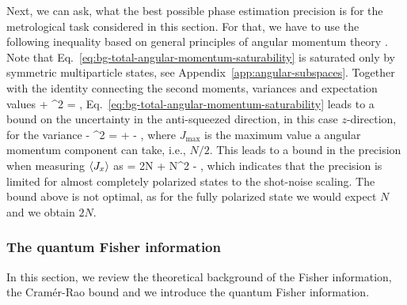 Next, we can ask, what the best possible phase estimation precision is for the metrological task considered in this section.
For that, we have to use the following inequality based on general principles of angular momentum theory
\be
  \label{eq:bg-total-angular-momentum-saturability}
   \leqslant {}.
\ee
Note that Eq.~\eqref{eq:bg-total-angular-momentum-saturability} is saturated only by symmetric multiparticle states, see Appendix~\ref{app:angular-subspaces}.
Together with the identity connecting the second moments, variances and expectation values
\be
   + ^2 = ,
\ee
Eq.~\eqref{eq:bg-total-angular-momentum-saturability} leads to a bound on the uncertainty in the anti-squeezed direction, in this case $z$-direction, for the variance
\be
   \leqslant {} - ^2 =  +  - \rpar,
\ee
where $J_{\max}$ is the maximum value a angular momentum component can take, i.e., $N/2$.
This leads to a bound in the precision when measuring $\langle{J_x}\rangle$ as
\be
  \label{eq:bg-unpolarize-states-are-better}
  \varinv{\theta} = \leqslant 2N + N^2 - \rpar,
\ee
which indicates that the precision is limited for almost completely polarized states to the shot-noise scaling.
The bound above is not optimal, as for the fully polarized state we would expect $N$ and we obtain $2N$.

\subsubsection{The quantum Fisher information}

In this section, we review the theoretical background of the Fisher information, the Cram\'er-Rao bound and we introduce the quantum Fisher information.

